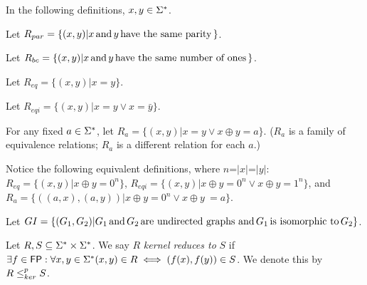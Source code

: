In the following definitions, $x,y\in\Sigma^{*}$.

Let $R_{par}=\{(x, y)|x \,\text{and}\, y \,\text{have the same parity}\,\}$.

Let $R_{bc}=\{(x, y)|x \,\text{and}\, y \,\text{have the same number of ones}\,\}$.

Let $R_{eq}=\{(x, y)|x = y\}$.

Let $R_{eqi}=\{(x, y)|x = y \lor x = \bar{y}\}$.

For any fixed $a\in\Sigma^{*}$, let $R_{a}=\{(x, y)|x = y \lor x \oplus y =
a\}$. ($R_{a}$ is a family of equivalence relations; $R_{a}$ is a different
relation for each $a$.)

Notice the following equivalent definitions, where $n$=$|x|$=$|y|$:
$R_{eq}=\{(x, y)|x \oplus y = 0^n\}$, $R_{eqi}=\{(x, y)|x \oplus y = 0^n \lor x
\oplus y = 1^n\}$, and $R_{a}=\{((a,x),(a,y))|x \oplus y = 0^n \lor x \oplus
y\ = a\}$.

Let $GI=\{(G_1,G_2)|G_1 \,\text{and}\, G_2 \,\text{are undirected graphs and}\, G_1
\,\text{is isomorphic to}\, G_2\}$.

\begin{definition}Let $R,S\subseteq\Sigma^{*}\times\Sigma^{*}$. We say $R$
  \textit{kernel reduces to} $S$ if $\exists f\in{\ensuremath{\mathsf{FP}}}:\forall x,y\in\Sigma^{*}
  (x, y)\in R \iff (f(x),f(y))\in S$. We denote this by $R\leq^{p}_{ker}
  S$.\end{definition}
